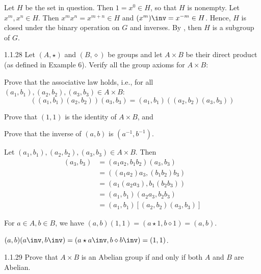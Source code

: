 \begin{sol}[spsol]
    Let $H$ be the set in question.
	Then $1 = x^0 \in H$, so that $H$ is nonempty.
	Let $x^m, x^n \in H$.
	Then $x^m x^n = x^{m + n} \in H$ and $(x^m)\inv = x^{-m} \in H$.
	Hence, $H$ is closed under the binary operation on $G$ and inverses.
	By , then $H$ is a subgroup of $G$.
\end{sol}

\begin{exercise}{1.1.28}
    Let $(A, \star)$ and $(B, \diamond)$ be groups and let $A \times B$ be their direct product (as defined in Example 6).
	Verify all the group axioms for $A \times B$:
    \begin{subexercises}
        \item Prove that the associative law holds, i.e., for all $(a_1, b_1), (a_2, b_2), (a_3, b_3) \in A \times B$:
        \[
        	( (a_1, b_1)(a_2, b_2) )(a_3, b_3) = (a_1, b_1)((a_2, b_2)(a_3, b_3))
        \]
        \item Prove that $(1, 1)$ is the identity of $A \times B$, and
        \item Prove that the inverse of $(a, b)$ is $(a^{-1}, b^{-1})$.
    \end{subexercises}
\end{exercise}

\begin{solenum}
    \item Let $(a_1, b_1), (a_2, b_2), (a_3, b_3) \in A \times B$.
	Then
    \begin{align*}
        [(a_1, b_1)(a_2, b_2)](a_3, b_3) & = (a_1a_2, b_1b_2)(a_3, b_3) \\
        & = ((a_1a_2)a_3, (b_1b_2)b_3) \\
        & = (a_1(a_2a_3), b_1(b_2b_3)) \\
        & = (a_1,b_1)(a_2a_3, b_2b_3) \\
        & = (a_1, b_1)[(a_2, b_2)(a_3, b_3)]
    \end{align*}
    \item For $a \in A, b \in B$, we have $(a, b)(1, 1) = (a \star 1, b \diamond 1) = (a, b)$.
    \item $(a, b)(a\inv, b\inv) = (a \star a\inv, b \diamond b\inv) = (1, 1)$.
\end{solenum}

\begin{exercise}{1.1.29}
    Prove that $A \times B$ is an Abelian group if and only if both $A$ and $B$ are Abelian.
\end{exercise}

